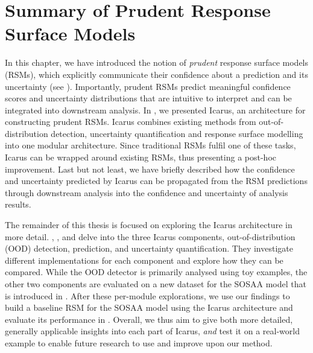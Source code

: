 \section{Summary of Prudent Response Surface Models} \label{txt:icarus-preview}

In this chapter, we have introduced the notion of \textit{prudent} response surface models (RSMs), which explicitly communicate their confidence about a prediction and its uncertainty (see ). Importantly, prudent RSMs predict meaningful confidence scores and uncertainty distributions that are intuitive to interpret and can be integrated into downstream analysis. In , we presented Icarus, an architecture for constructing prudent RSMs. Icarus combines existing methods from out-of-distribution detection, uncertainty quantification and response surface modelling into one modular architecture. Since traditional RSMs fulfil one of these tasks, Icarus can be wrapped around existing RSMs, thus presenting a post-hoc improvement. Last but not least, we have briefly described how the confidence and uncertainty predicted by Icarus can be propagated from the RSM predictions through downstream analysis into the confidence and uncertainty of analysis results.

\newpar The remainder of this thesis is focused on exploring the Icarus architecture in more detail. , , and  delve into the three Icarus components, out-of-distribution (OOD) detection, prediction, and uncertainty quantification. They investigate different implementations for each component and explore how they can be compared. While the OOD detector is primarily analysed using toy examples, the other two components are evaluated on a new dataset for the SOSAA model that is introduced in . After these per-module explorations, we use our findings to build a baseline RSM for the SOSAA model using the Icarus architecture and evaluate its performance in . Overall, we thus aim to give both more detailed, generally applicable insights into each part of Icarus, \textit{and} test it on a real-world example to enable future research to use and improve upon our method.
